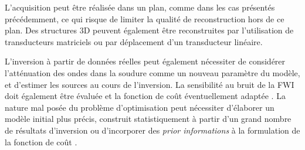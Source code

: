 L'acquisition peut être réalisée dans un plan, comme dans les cas présentés précédemment, ce qui risque de limiter la qualité de reconstruction hors de ce plan. Des structures 3D peuvent également être reconstruites par l'utilisation de transducteurs matriciels ou par déplacement d'un transducteur linéaire.


L'inversion à partir de données réelles peut également nécessiter de considérer l'atténuation des ondes dans la soudure comme un nouveau paramètre du modèle, et d'estimer les sources au cours de l'inversion. La sensibilité au bruit de la FWI doit également être évaluée et la fonction de coût éventuellement adaptée \citep{brossier_2010}. La nature mal posée du problème d'optimisation peut nécessiter d'élaborer un modèle initial plus précis, construit statistiquement à partir d'un grand nombre de résultats d'inversion ou d'incorporer des \emph{prior informations} à la formulation de la fonction de coût \citep{asnaashari}.
















